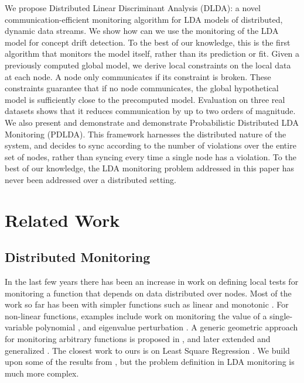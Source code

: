 \documentclass{sig-alternate-05-2015}
\begin{document}
We propose Distributed Linear Discriminant Analysis (DLDA): a novel
communication-efficient monitoring algorithm for LDA models of distributed, 
dynamic data streams.
We show how can we use the monitoring of the LDA model for concept drift
detection.
To the best of our knowledge, this is the first algorithm that monitors the
model itself, rather than its prediction or fit. Given a previously computed
global model, we derive local constraints on the local data at each node. A node only communicates
if its constraint is broken. These constraints guarantee that
if no node communicates, the global hypothetical model is
sufficiently close to the precomputed model.
Evaluation on three real datasets shows that it reduces communication by up to
two orders of magnitude. 
We also present and demonstrate and demonstrate 
Probabilistic Distributed LDA Monitoring (PDLDA). This framework harnesses the 
distributed nature of the system, and decides to sync according 
to the number of violations over the entire set of nodes, rather than syncing every
time a single node has a violation.
To the best of our knowledge, the LDA monitoring
problem addressed in this paper has never been addressed over a distributed
setting.

\section{Related Work}
\subsection{Distributed Monitoring}
In the last few years there has been an increase in work on defining local tests 
for monitoring a function that depends on data distributed over nodes.
Most of the work so far has been with simpler functions such as linear
\cite{keralapura2006communication, kashyap2008efficient} and monotonic \cite{michel2005klee}.
For non-linear functions, examples include work on monitoring
the value of a single-variable polynomial \cite{shah2008handling}, 
and eigenvalue perturbation \cite{huang2007communication}. 
A generic geometric approach for monitoring arbitrary functions is proposed in
\cite{sharfman2007geometric}, and later extended and generalized
\cite{keren2012shape,lazerson2015monitoring}. 
The closest work to ours is on Least Square Regression
\cite{gabel2015monitoring}. We build upon some of the results from
\cite{gabel2015monitoring}, but the problem definition in LDA monitoring is much
more complex.
\end{document}
